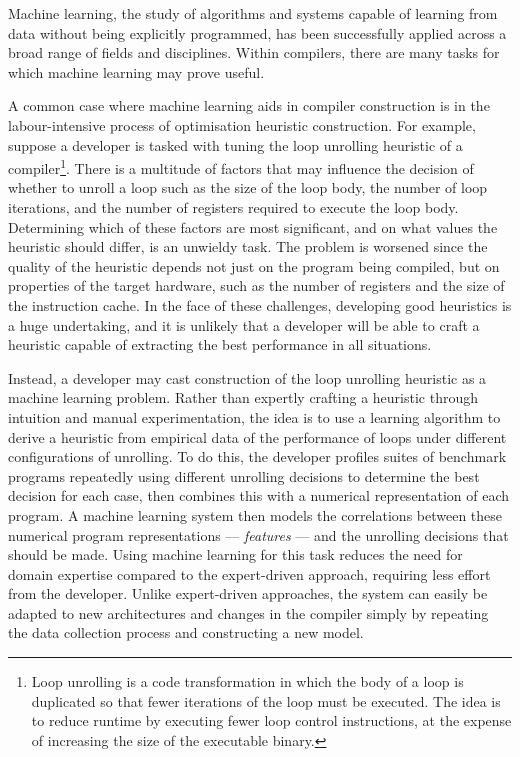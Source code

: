 Machine learning, the study of algorithms and systems capable of learning from data without being explicitly programmed, has been successfully applied across a broad range of fields and disciplines. Within compilers, there are many tasks for which machine learning may prove useful.

A common case where machine learning aids in compiler construction is in the labour-intensive process of optimisation heuristic construction. For example, suppose a developer is tasked with tuning the loop unrolling heuristic of a compiler\footnote{Loop unrolling is a code transformation in which the body of a loop is duplicated so that fewer iterations of the loop must be executed. The idea is to reduce runtime by executing fewer loop control instructions, at the expense of increasing the size of the executable binary.}. There is a multitude of factors that may influence the decision of whether to unroll a loop such as the size of the loop body, the number of loop iterations, and the number of registers required to execute the loop body. Determining which of these factors are most significant, and on what values the heuristic should differ, is an unwieldy task. The problem is worsened since the quality of the heuristic depends not just on the program being compiled, but on properties of the target hardware, such as the number of registers and the size of the instruction cache. In the face of these challenges, developing good heuristics is a huge undertaking, and it is unlikely that a developer will be able to craft a heuristic capable of extracting the best performance in all situations.

Instead, a developer may cast construction of the loop unrolling heuristic as a machine learning problem. Rather than expertly crafting a heuristic through intuition and manual experimentation, the idea is to use a learning algorithm to derive a heuristic from empirical data of the performance of loops under different configurations of unrolling. To do this, the developer profiles suites of benchmark programs repeatedly using different unrolling decisions to determine the best decision for each case, then combines this with a numerical representation of each program. A machine learning system then models the correlations between these numerical program representations --- \emph{features} --- and the unrolling decisions that should be made. Using machine learning for this task reduces the need for domain expertise compared to the expert-driven approach, requiring less effort from the developer. Unlike expert-driven approaches, the system can easily be adapted to new architectures and changes in the compiler simply by repeating the data collection process and constructing a new model.

